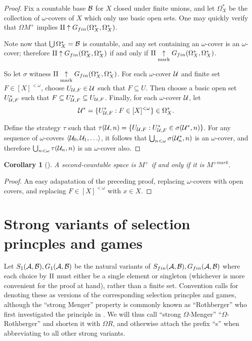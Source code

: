 \documentclass{amsart}
\theoremstyle{plain}
\newtheorem{corollary}[theorem]{Corollary}
\theoremstyle{definition}
\theoremstyle{remark}
\theoremstyle{plain}
\theoremstyle{definition}
\theoremstyle{remark}
\begin{document}
\begin{proof}
  Fix a countable base \(\mathcal{B}\) for \(X\) closed under finite unions, and let
  \(\Omega_X^*\) be the collection of \(\omega\)-covers of \(X\) which only
  use basic open sets.
  One may quickly verify that
  \(\Omega M^+\) implies
  \(\mathrm{II}\uparrow G_{fin}(\Omega_X^*,\Omega_X^*)\).

  Note now that
  \(\bigcup\Omega_X^*=\mathcal{B}\) is countable, and any set containing an
  \(\omega\)-cover is an \(\omega\)-cover; therefore
  \(\mathrm{II}\uparrow G_{fin}(\Omega_X^*,\Omega_X^*)\) if and only if
  \(\mathrm{II}\underset{\text{mark}}{\uparrow}G_{fin}(\Omega_X^*,\Omega_X^*)\).

  So let \(\sigma\) witness
  \(\mathrm{II}\underset{\text{mark}}{\uparrow}G_{fin}(\Omega_X^*,\Omega_X^*)\).
  For each \(\omega\)-cover \(\mathcal{U}\) and finite set \(F\in[X]^{<\omega}\),
  choose \(U_{\mathcal{U},F}\in\mathcal{U}\) such that \(F\subseteq U\). Then choose a
  basic open set \(U_{\mathcal{U},F}^*\) such that
  \(F\subseteq U_{\mathcal{U},F}^*\subseteq U_{\mathcal{U},F}\). Finally, for each
  \(\omega\)-cover \(\mathcal{U}\), let
  \[
    \mathcal{U}^*
      =
    \{
      U_{\mathcal{U},F}^*
        :
      F\in[X]^{<\omega}
    \}
      \in
    \Omega_X^*
  .\]

  Define the strategy \(\tau\) such that
  \(\tau(\mathcal{U},n)=\{U_{\mathcal{U},F}:U_{\mathcal{U},F}^*\in\sigma(\mathcal{U}^*,n)\}\).
  For any sequence of \(\omega\)-covers \(\<\mc U_0,\mc U_1,\dots\>\),
  it follows that \(\bigcup_{n<\omega}\sigma(\mathcal{U}_n^*,n)\) is an
  \(\omega\)-cover, and therefore
  \(\bigcup_{n<\omega}\tau(\mathcal{U}_n,n)\) is an \(\omega\)-cover also.
\end{proof}

\begin{corollary}[\cite{clontzMengerCMUC}]
  A second-countable space is \(M^+\) if and only if
  it is \(M^{+mark}\).
\end{corollary}

\begin{proof}
  An easy adapatation of the preceding proof, replacing \(\omega\)-covers
  with open covers, and replacing \(F\in[X]^{<\omega}\) with \(x\in X\).
\end{proof}

\section{Strong variants of selection princples and games}

Let \(S_{1}(\mathcal{A},\mathcal{B}),G_{1}(\mathcal{A},\mathcal{B})\)
be the natural variants of
\(S_{fin}(\mathcal{A},\mathcal{B}),G_{fin}(\mathcal{A},\mathcal{B})\) where each choice
by \(\mathrm{II}\) must either be a single element or singleton
(whichever is more convenient for the proof at hand), rather than a finite
set. Convention calls for denoting these as
 versions of the corresponding selection princples and games,
although the ``strong Menger'' property is commonly known as ``Rothberger''
who first investigated the principle in \cite{Rothberger1938}. We will thus
call ``strong \(\Omega\)-Menger'' ``\(\Omega\)-Rothberger'' and shorten it
with \(\Omega R\), and otherwise attach the prefix ``s''
when abbreviating to all other strong variants.
\end{document}
